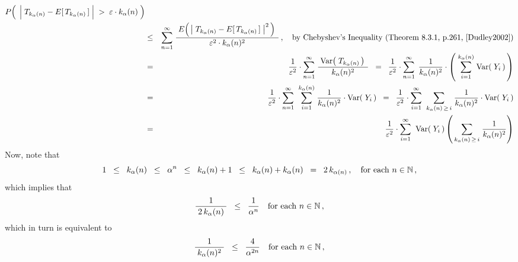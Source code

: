 \begin{enumerate}
\begin{eqnarray*}
	P\!\left(\;\,
		\left\vert\;T_{k_{\alpha}(n)} \overset{{\color{white}.}}{-} E[\,T_{k_{\alpha}(n)}\,]\;\right\vert
		\;>\;\varepsilon \cdot k_{\alpha}(n)
		\;\right)
\\
& \leq &
	\overset{\infty}{\underset{n=1}{\sum}}\;
	\dfrac{
		{\color{white}.}E\!\left(\,\left\vert\;T_{k_{\alpha}(n)} - E[\,T_{k_{\alpha}(n)}\,]\;\right\vert^{2}\,\right){\color{white}.}
		}{
		\varepsilon^{2} \cdot k_{\alpha}(n)^{2}
		}\,,
	\quad\textnormal{by Chebyshev's Inequality (Theorem 8.3.1, p.261, \cite{Dudley2002})}
\\
& = &
	\dfrac{1}{\varepsilon^{2}} \cdot
	\overset{\infty}{\underset{n=1}{\sum}}\;
	\dfrac{
		{\color{white}.}\Var\!\left(\;T_{k_{\alpha}(n)}\,\right){\color{white}.}
		}{
		k_{\alpha}(n)^{2}
		}
	\;\; = \;\;
	\dfrac{1}{\varepsilon^{2}} \cdot
	\overset{\infty}{\underset{n=1}{\sum}}\;\,
	\dfrac{1}{k_{\alpha}(n)^{2}} \cdot
	\left(\;\overset{k_{\alpha}(n)}{\underset{i=1}{\sum}}\;\Var\!\left(\;Y_{i}\,\right)\,\right)
\\
& = &
	\dfrac{1}{\varepsilon^{2}} \cdot
	\overset{\infty}{\underset{n=1}{\sum}}\;\;
	\overset{k_{\alpha}(n)}{\underset{i=1}{\sum}}\;
		\dfrac{1}{k_{\alpha}(n)^{2}} \cdot \Var\!\left(\;Y_{i}\,\right)
	\;\; = \;\;
	\dfrac{1}{\varepsilon^{2}} \cdot
	\overset{\infty}{\underset{i=1}{\sum}}\;\;
	\underset{k_{\alpha}(n)\,\geq\,i}{\sum}\;
		\dfrac{1}{k_{\alpha}(n)^{2}} \cdot \Var\!\left(\;Y_{i}\,\right)
\\
& = &
	\dfrac{1}{\varepsilon^{2}} \cdot
	\overset{\infty}{\underset{i=1}{\sum}}\;\;
	\Var\!\left(\;Y_{i}\,\right)
		\left(\,
			\underset{k_{\alpha}(n)\,\geq\,i}{\sum}\;
			\dfrac{1}{k_{\alpha}(n)^{2}}
			\right)
\end{eqnarray*}
Now, note that
\begin{equation*}
1 \;\;\leq\;\; k_{\alpha}(n) \;\;\leq\;\; \alpha^{n} \;\;\leq\;\; k_{\alpha}(n) + 1
\;\;\leq\;\; k_{\alpha}(n) + k_{\alpha}(n) \;\;=\;\; 2\,k_{\alpha(n)}\,,
\quad
\textnormal{for each $n \in \mathbb{N}$}\,,
\end{equation*}
which implies that
\begin{equation*}
\dfrac{1}{{\color{white}.}2\,k_{\alpha}(n){\color{white}.}} \;\;\leq\;\; \dfrac{1}{\alpha^{n}}
\quad
\textnormal{for each $n \in \N$}\,,
\end{equation*}
which in turn is equivalent to
\begin{equation*}
\dfrac{1}{{\color{white}.}k_{\alpha}(n)^{2}{\color{white}.}} \;\;\leq\;\; \dfrac{4}{\alpha^{2n}}
\quad
\textnormal{for each $n \in \N$}\,,
\end{equation*}

\end{enumerate}
